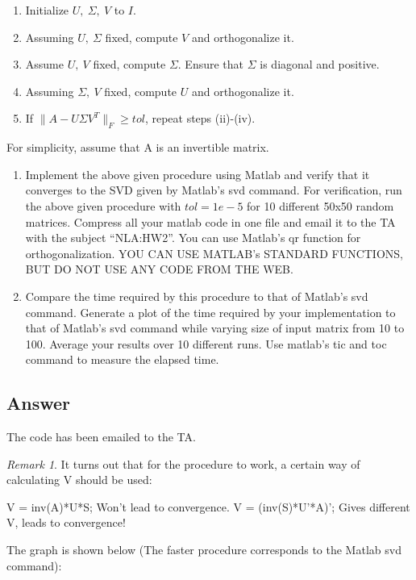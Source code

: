 \documentclass[10pt]{amsart}
\theoremstyle{remark}
\newtheorem{rem}[thm]{Remark}
\begin{document}
\begin{enumerate}
\renewcommand{\labelenumii}{(\roman{enumii})}
\item Initialize $U,\ \Sigma,\ V$ to $I$.
\item Assuming $U,\ \Sigma$ fixed, compute $V$ and orthogonalize it.
\item Assume $U, \ V$ fixed, compute $\Sigma$. Ensure that $\Sigma$ is diagonal and positive.
\item Assuming $\Sigma,\ V$ fixed, compute $U$ and orthogonalize it.
\item If $\|A-U\Sigma V^T\|_F\geq tol$, repeat steps (ii)-(iv).
\end{enumerate}
For simplicity, assume that A is an invertible matrix. 
\begin{enumerate}
\item Implement the above given procedure using Matlab and verify that it converges to the SVD given by Matlab's {\sf svd} command. For verification, run the above given procedure with $tol=1e-5$ for 10 different 50x50 random matrices. Compress all your matlab code in one file and email it to the TA with the subject ``NLA:HW2''. You can use Matlab's {\sf qr} function for orthogonalization. YOU CAN USE MATLAB's STANDARD FUNCTIONS, BUT DO NOT USE ANY CODE FROM THE WEB.
\item Compare the time required by this procedure to that of Matlab's {\sf svd} command. Generate a plot of the time required by your implementation to that of Matlab's {\sf svd} command while varying size of input matrix from 10 to 100. Average your results over 10 different runs. Use matlab's {\sf tic} and {\sf toc} command to measure the elapsed time.
\end{enumerate}

\subsection{Answer}
The code has been emailed to the TA.

\begin{rem}
It turns out that for the procedure to work, a certain way of
calculating V should be used:

   V = inv(A)*U*S; Won't lead to convergence.
   V = (inv(S)*U'*A)'; Gives different V, leads to convergence!

\end{rem}

The graph is shown below (The faster procedure corresponds to the Matlab svd command):
\end{document}
